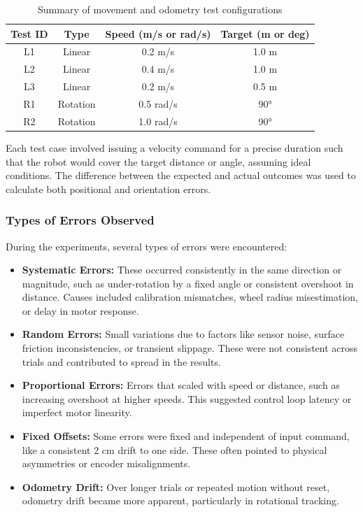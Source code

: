 \documentclass[a4paper, 12pt]{article}
\begin{document}
    \begin{table}[H]
    \centering
    \begin{tabular}{|c|c|c|c|}
    \hline
    \textbf{Test ID} & \textbf{Type} & \textbf{Speed (m/s or rad/s)} & \textbf{Target (m or deg)} \\
    \hline
    L1 & Linear & 0.2 m/s & 1.0 m \\
    L2 & Linear & 0.4 m/s & 1.0 m \\
    L3 & Linear & 0.2 m/s & 0.5 m \\
    R1 & Rotation & 0.5 rad/s & 90° \\
    R2 & Rotation & 1.0 rad/s & 90° \\
    \hline
    \end{tabular}
    \caption{Summary of movement and odometry test configurations}
    \end{table}

    Each test case involved issuing a velocity command for a precise duration such that the robot would cover the target distance or angle, assuming ideal conditions. The difference between the expected and actual outcomes was used to calculate both positional and orientation errors.

    \subsubsection*{Types of Errors Observed}

    During the experiments, several types of errors were encountered:

    \begin{itemize}
        \item \textbf{Systematic Errors:} These occurred consistently in the same direction or magnitude, such as under-rotation by a fixed angle or consistent overshoot in distance. Causes included calibration mismatches, wheel radius misestimation, or delay in motor response.
        
        \item \textbf{Random Errors:} Small variations due to factors like sensor noise, surface friction inconsistencies, or transient slippage. These were not consistent across trials and contributed to spread in the results.

        \item \textbf{Proportional Errors:} Errors that scaled with speed or distance, such as increasing overshoot at higher speeds. This suggested control loop latency or imperfect motor linearity.

        \item \textbf{Fixed Offsets:} Some errors were fixed and independent of input command, like a consistent 2 cm drift to one side. These often pointed to physical asymmetries or encoder misalignments.

        \item \textbf{Odometry Drift:} Over longer trials or repeated motion without reset, odometry drift became more apparent, particularly in rotational tracking.
    \end{itemize}
\end{document}
